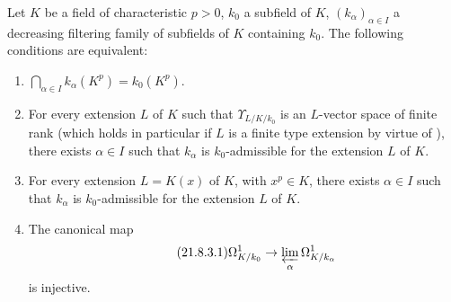 \begin{theorem}[21.8.3]
\label{0.21.8.3}
Let $K$ be a field of characteristic $p>0$, $k_0$ a subfield of $K$, $(k_\alpha)_{\alpha\in I}$ a decreasing filtering family of subfields of $K$ containing $k_0$.
The following conditions are equivalent:
\begin{enumerate}
  \item[\rm a)] $\bigcap_{\alpha\in I}k_\alpha(K^p)=k_0(K^p)$.
  \item[\rm b)] For every extension $L$ of $K$ such that $\Upsilon_{L/K/k_0}$ is an $L$-vector space of finite rank \textup{(}which holds in particular if $L$ is a finite type extension by virtue of \textup{)}, there exists $\alpha\in I$ such that $k_\alpha$ is $k_0$-admissible for the extension $L$ of $K$.
  \item[\rm b$'$)] For every extension $L=K(x)$ of $K$, with $x^p\in K$, there exists $\alpha\in I$ such that $k_\alpha$ is $k_0$-admissible for the extension $L$ of $K$.
  \item[\rm c)] The canonical map
  \begin{equation}
  \tag{21.8.3.1}
  \label{0.21.8.3.1}
    \Omega^1_{K/k_0}\to\varprojlim_\alpha\Omega^1_{K/k_\alpha}
  \end{equation}
  is injective.
\end{enumerate}
\end{theorem}

